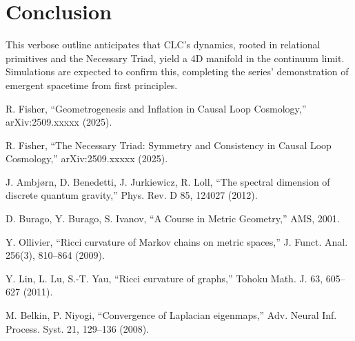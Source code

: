\documentclass[11pt, a4paper]{article}
\begin{document}
\section{Conclusion}

This verbose outline anticipates that CLC's dynamics, rooted in relational primitives and the Necessary Triad, yield a 4D manifold in the continuum limit. Simulations are expected to confirm this, completing the series' demonstration of emergent spacetime from first principles.

\begin{thebibliography}{99}
R. Fisher, ``Geometrogenesis and Inflation in Causal Loop Cosmology,'' arXiv:2509.xxxxx (2025).

R. Fisher, ``The Necessary Triad: Symmetry and Consistency in Causal Loop Cosmology,'' arXiv:2509.xxxxx (2025).

J. Ambjørn, D. Benedetti, J. Jurkiewicz, R. Loll, ``The spectral dimension of discrete quantum gravity,'' Phys. Rev. D 85, 124027 (2012).

D. Burago, Y. Burago, S. Ivanov, ``A Course in Metric Geometry,'' AMS, 2001.

Y. Ollivier, ``Ricci curvature of Markov chains on metric spaces,'' J. Funct. Anal. 256(3), 810–864 (2009).

Y. Lin, L. Lu, S.-T. Yau, ``Ricci curvature of graphs,'' Tohoku Math. J. 63, 605–627 (2011).

M. Belkin, P. Niyogi, ``Convergence of Laplacian eigenmaps,'' Adv. Neural Inf. Process. Syst. 21, 129–136 (2008).
\end{thebibliography}
\end{document}
